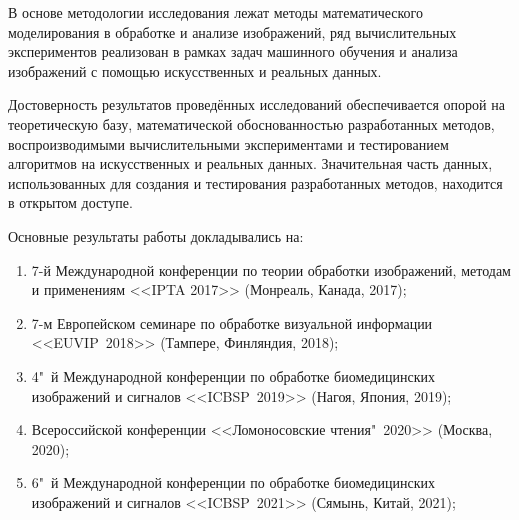 {\methods} 

В основе методологии исследования лежат методы математического моделирования в обработке и анализе изображений, ряд вычислительных экспериментов реализован в рамках задач машинного обучения и анализа изображений с помощью искусственных и реальных данных.


{\reliability}

Достоверность результатов проведённых исследований обеспечивается опорой на теоретическую базу, математической обоснованностью разработанных методов, воспроизводимыми вычислительными экспериментами и тестированием алгоритмов на искусственных и реальных данных. Значительная часть данных, использованных для создания и тестирования разработанных методов, находится в открытом доступе.


{\probation}

Основные результаты работы докладывались на:

\begin {enumerate}[beginpenalty=10000]
	\item 7-й Международной конференции по теории обработки изображений, методам и применениям <<IPTA 2017>> (Монреаль, Канада, 2017);
	
	\item 7-м Европейском семинаре по обработке визуальной информации <<EUVIP~2018>> (Тампере, Финляндия, 2018);
	
	\item 4"~й Международной конференции по обработке биомедицинских изображений и сигналов <<ICBSP~2019>> (Нагоя, Япония, 2019);
	
	\item Всероссийской конференции <<Ломоносовские чтения"~2020>> (Москва, 2020);
	
	\item 6"~й Международной конференции по обработке биомедицинских изображений и сигналов <<ICBSP~2021>> (Сямынь, Китай, 2021);
\end {enumerate}



